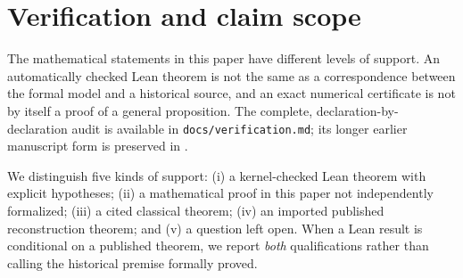 \section{Verification and claim scope}
\label{app:ledger}

The mathematical statements in this paper have different levels of support.
An automatically checked Lean theorem is not the same as a correspondence
between the formal model and a historical source, and an exact numerical
certificate is not by itself a proof of a general proposition.
The complete, declaration-by-declaration audit is available in
\texttt{docs/verification.md}; its longer earlier manuscript form is preserved
in .

We distinguish five kinds of support:
(i) a kernel-checked Lean theorem with explicit hypotheses;
(ii) a mathematical proof in this paper not independently formalized;
(iii) a cited classical theorem;
(iv) an imported published reconstruction theorem; and
(v) a question left open.  When a Lean result is conditional on a published
theorem, we report \emph{both} qualifications rather than calling the
historical premise formally proved.

